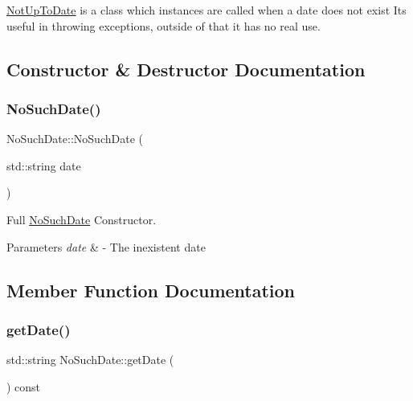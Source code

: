 \mbox{\hyperlink{classNotUpToDate}{Not\+Up\+To\+Date}} is a class which instances are called when a date does not exist Its useful in throwing exceptions, outside of that it has no real use. 

\subsection{Constructor \& Destructor Documentation}
\mbox{\label{classNoSuchDate_a0cad1c9e0d0a034a885b2529d6f79811}} 
\subsubsection{\texorpdfstring{No\+Such\+Date()}{NoSuchDate()}}
{\footnotesize\ttfamily No\+Such\+Date\+::\+No\+Such\+Date (\begin{DoxyParamCaption}\item[{std\+::string}]{date }\end{DoxyParamCaption})\hspace{0.3cm}{\ttfamily [inline]}}



Full \mbox{\hyperlink{classNoSuchDate}{No\+Such\+Date}} Constructor. 


\begin{DoxyParams}{Parameters}
{\em date} & -\/ The inexistent date \\
\hline
\end{DoxyParams}


\subsection{Member Function Documentation}
\mbox{\label{classNoSuchDate_ad78fefa7d990af927c46096722a00f2c}} 
\subsubsection{\texorpdfstring{get\+Date()}{getDate()}}
{\footnotesize\ttfamily std\+::string No\+Such\+Date\+::get\+Date (\begin{DoxyParamCaption}{ }\end{DoxyParamCaption}) const\hspace{0.3cm}{\ttfamily [inline]}}



